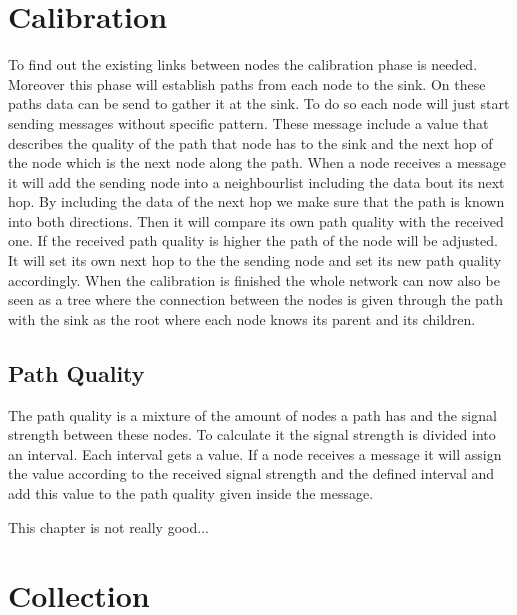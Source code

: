 \section{Calibration}
To find out the existing links between nodes the calibration phase is needed. Moreover this phase will establish paths from each node to the sink. On these paths data can be send to gather it at the sink. To do so each node will just start sending messages without specific pattern. These message include a value that describes the quality of the path that node has to the sink and the next hop of the node which is the next node along the path. When a node receives a message it will add the sending node into a neighbourlist including the data bout its next hop. By including the data of the next hop we make sure that the path is known into both directions. Then it will compare its own path quality with the received one. If the received path quality is higher the path of the node will be adjusted. It will set its own next hop to the the sending node and set its new path quality accordingly. When the calibration is finished the whole network can now also be seen as a tree where the connection between the nodes is given through the path with the sink as the root where each node knows its parent and its children.
\subsection{Path Quality}
The path quality is a mixture of the amount of nodes a path has and the signal strength between these nodes. To calculate it the signal strength is divided into an interval. Each interval gets a value. If a node receives a message it will assign the value according to the received signal strength and the defined interval and add this value to the path quality given inside the message. 


This chapter is not really good...
\section{Collection}

